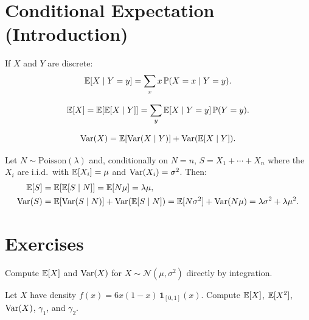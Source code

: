\section{Conditional Expectation (Introduction)}

\begin{definition}
If $X$ and $Y$ are discrete:
\[
    \mathbb{E}[X \mid Y = y] = \sum_x x\,\mathbb{P}(X = x \mid Y = y).
\]
\end{definition}

\begin{theorem}
\[
    \mathbb{E}[X] = \mathbb{E}[\mathbb{E}[X \mid Y]] = \sum_y \mathbb{E}[X \mid Y = y]\,\mathbb{P}(Y = y).
\]
\end{theorem}

\begin{theorem}
\[
    \mathrm{Var}(X) = \mathbb{E}[\mathrm{Var}(X \mid Y)] + \mathrm{Var}(\mathbb{E}[X \mid Y]).
\]
\end{theorem}

\begin{example}
Let $N \sim \mathrm{Poisson}(\lambda)$ and, conditionally on $N = n$,
$S = X_1 + \cdots + X_n$ where the $X_i$ are i.i.d.\ with $\mathbb{E}[X_i] = \mu$
and $\mathrm{Var}(X_i) = \sigma^2$. Then:
\begin{align*}
    \mathbb{E}[S] &= \mathbb{E}[\mathbb{E}[S \mid N]] = \mathbb{E}[N\mu] = \lambda\mu, \\
    \mathrm{Var}(S) &= \mathbb{E}[\mathrm{Var}(S \mid N)] + \mathrm{Var}(\mathbb{E}[S \mid N])
    = \mathbb{E}[N\sigma^2] + \mathrm{Var}(N\mu) = \lambda\sigma^2 + \lambda\mu^2.
\end{align*}
\end{example}

\section{Exercises}

\begin{exercise}
Compute $\mathbb{E}[X]$ and $\mathrm{Var}(X)$ for $X \sim \mathcal{N}(\mu, \sigma^2)$ directly
by integration.
\end{exercise}

\begin{exercise}
Let $X$ have density $f(x) = 6x(1-x)\,\mathbf{1}_{[0,1]}(x)$. Compute $\mathbb{E}[X]$,
$\mathbb{E}[X^2]$, $\mathrm{Var}(X)$, $\gamma_1$, and $\gamma_2$.
\end{exercise}

